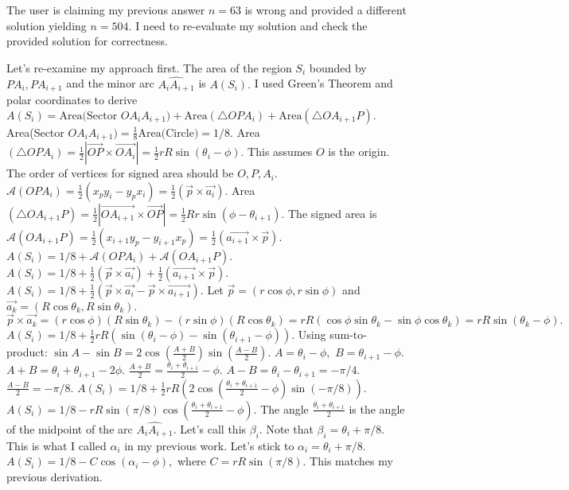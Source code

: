 The user is claiming my previous answer $n=63$ is wrong and provided a different solution yielding $n=504.$ I need to re-evaluate my solution and check the provided solution for correctness.

Let's re-examine my approach first. 
The area of the region $S_i$ bounded by $PA_i, PA_{i+1}$ and the minor arc $\widehat{A_iA_{i+1}}$ is $A(S_i).$ 
I used Green's Theorem and polar coordinates to derive $A(S_i) = \text{Area(Sector } OA_iA_{i+1}) + \text{Area}(\triangle OPA_i) + \text{Area}(\triangle OA_{i+1}P).$ 
Area(Sector $OA_iA_{i+1}) = \frac{1}{8} \text{Area(Circle)} = 1/8.$ 
Area $(\triangle OPA_i) = \frac{1}{2} |\vec{OP} \times \vec{OA_i}| = \frac{1}{2} r R \sin(\theta_i - \phi).$ This assumes $O$ is the origin. The order of vertices for signed area should be $O, P, A_i.$ $\mathcal{A}(OPA_i) = \frac{1}{2} (x_p y_i - y_p x_i) = \frac{1}{2} (\vec{p} \times \vec{a_i}).$ 
Area $(\triangle OA_{i+1}P) = \frac{1}{2} |\vec{OA_{i+1}} \times \vec{OP}| = \frac{1}{2} R r \sin(\phi - \theta_{i+1}).$ The signed area is $\mathcal{A}(OA_{i+1}P) = \frac{1}{2} (x_{i+1} y_p - y_{i+1} x_p) = \frac{1}{2} (\vec{a_{i+1}} \times \vec{p}).$ 
$A(S_i) = 1/8 + \mathcal{A}(OPA_i) + \mathcal{A}(OA_{i+1}P).$ 
$A(S_i) = 1/8 + \frac{1}{2} (\vec{p} \times \vec{a_i}) + \frac{1}{2} (\vec{a_{i+1}} \times \vec{p}).$ 
$A(S_i) = 1/8 + \frac{1}{2} (\vec{p} \times \vec{a_i} - \vec{p} \times \vec{a_{i+1}}).$ 
Let $\vec{p} = (r \cos \phi, r \sin \phi)$ and $\vec{a_k} = (R \cos \theta_k, R \sin \theta_k).$ 
$\vec{p} \times \vec{a_k} = (r \cos \phi)(R \sin \theta_k) - (r \sin \phi)(R \cos \theta_k) = rR (\cos \phi \sin \theta_k - \sin \phi \cos \theta_k) = rR \sin(\theta_k - \phi).$ 
$A(S_i) = 1/8 + \frac{1}{2} rR (\sin(\theta_i - \phi) - \sin(\theta_{i+1} - \phi)).$ 
Using sum-to-product: $\sin A - \sin B = 2 \cos(\frac{A+B}{2}) \sin(\frac{A-B}{2}).$ 
$A = \theta_i - \phi,$ $B = \theta_{i+1} - \phi.$ 
$A+B = \theta_i + \theta_{i+1} - 2\phi.$ $\frac{A+B}{2} = \frac{\theta_i + \theta_{i+1}}{2} - \phi.$ 
$A-B = \theta_i - \theta_{i+1} = -\pi/4.$ $\frac{A-B}{2} = -\pi/8.$ 
$A(S_i) = 1/8 + \frac{1}{2} rR (2 \cos(\frac{\theta_i + \theta_{i+1}}{2} - \phi) \sin(-\pi/8)).$ 
$A(S_i) = 1/8 - rR \sin(\pi/8) \cos(\frac{\theta_i + \theta_{i+1}}{2} - \phi).$ 
The angle $\frac{\theta_i + \theta_{i+1}}{2}$ is the angle of the midpoint of the arc $\widehat{A_iA_{i+1}}.$ Let's call this $\beta_i.$ Note that $\beta_i = \theta_i + \pi/8.$ This is what I called $\alpha_i$ in my previous work. Let's stick to $\alpha_i = \theta_i + \pi/8.$ 
$A(S_i) = 1/8 - C \cos(\alpha_i - \phi),$ where $C = rR \sin(\pi/8).$ This matches my previous derivation. 

